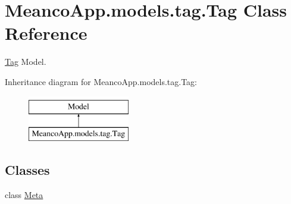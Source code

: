 \hypertarget{class_meanco_app_1_1models_1_1tag_1_1_tag}{}\section{Meanco\+App.\+models.\+tag.\+Tag Class Reference}
\label{class_meanco_app_1_1models_1_1tag_1_1_tag}


\hyperlink{class_meanco_app_1_1models_1_1tag_1_1_tag}{Tag} Model.  


Inheritance diagram for Meanco\+App.\+models.\+tag.\+Tag\+:\begin{figure}[H]
\begin{center}
\leavevmode
\includegraphics[height=2.000000cm]{class_meanco_app_1_1models_1_1tag_1_1_tag}
\end{center}
\end{figure}
\subsection*{Classes}
\begin{DoxyCompactItemize}
\item 
class \hyperlink{class_meanco_app_1_1models_1_1tag_1_1_tag_1_1_meta}{Meta}
\end{DoxyCompactItemize}
